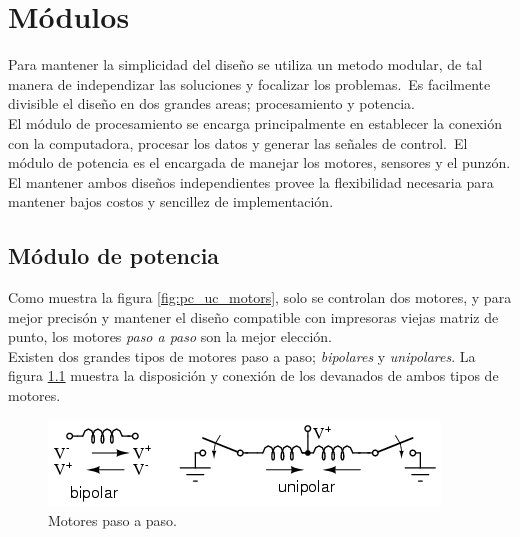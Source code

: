 \chapter{M\'odulos}

Para mantener la simplicidad del dise\~no se utiliza un metodo modular, de tal
manera de independizar las soluciones y focalizar los problemas.\
Es facilmente divisible el dise\~no en dos grandes areas; procesamiento y
potencia.\\

El m\'odulo de procesamiento se encarga principalmente en establecer la
conexi\'on con la computadora, procesar los datos y generar las se\~nales de
control.\
El m\'odulo de potencia es el encargada de manejar los motores, sensores y el
punz\'on.\\

El mantener ambos dise\~nos independientes provee la flexibilidad necesaria
para mantener bajos costos y sencillez de implementaci\'on.


\section{M\'odulo de potencia}\label{cap:motors_section}
Como muestra la figura \ref{fig:pc_uc_motors}, solo se controlan dos motores, y
para mejor precis\'on y mantener el dise\~no compatible con impresoras viejas
matriz de punto, los motores \emph{paso a paso} son la mejor elecci\'on.\\

Existen dos grandes tipos de motores paso a paso; \emph{bipolares} y
\emph{unipolares}. La figura \ref{fig:stepper_motors} muestra la disposici\'on
y conexi\'on de los devanados de ambos tipos de motores. 


\begin{figure}[htp]
\centering
\includegraphics[scale=0.7]{./img/02440.png}
\caption{Motores paso a paso.}
\label{fig:stepper_motors}
\end{figure}


